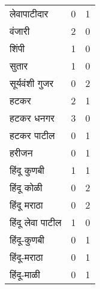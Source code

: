 \documentclass{article}
\begin{document}
\begin{table}
\begin{tabular}{lrr}
लेवापाटीदार & 0 & 1 \\
वंजारी & 2 & 0 \\
शिंपी & 1 & 0 \\
सुतार & 1 & 0 \\
सूर्यवंशी गुजर & 0 & 2 \\
हटकर & 2 & 1 \\
हटकर धनगर & 3 & 0 \\
हटकर पाटील & 0 & 1 \\
हरीजन & 0 & 1 \\
हिंदू कुणबी & 1 & 1 \\
हिंदू कोळी & 0 & 2 \\
हिंदू मराठा & 0 & 2 \\
हिंदू लेवा पाटील & 1 & 0 \\
हिंदू-कुणबी & 0 & 1 \\
हिंदू-मराठा & 0 & 1 \\
हिंदू-माळी & 0 & 1 \\
\bottomrule
\end{tabular}
\end{table}
\end{document}
